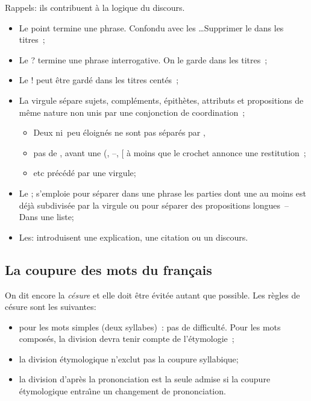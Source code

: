 \documentclass[twoside]{article}
\begin{document}
Rappels: ils contribuent \`a la logique du discours.
\begin{itemize}

\item Le point termine une phrase. Confondu avec les \ldots Supprimer le
dans les titres~;

\item Le ? termine une phrase interrogative. On le garde dans les
titres~;

\item Le ! peut \^etre gard\'e dans les titres cent\'es~;

\item La virgule s\'epare sujets, compl\'ements, \'epith\`etes,
attributs et propositions de m\^eme nature non unis par une conjonction
de coordination~;

\begin{itemize}

\item Deux \og ni\fg\ peu \'eloign\'es ne sont pas s\'epar\'es par ,

\item pas de , avant une (, --, [ \`a moins que le crochet annonce une
restitution~;

\item etc pr\'ec\'ed\'e par une virgule;

\end{itemize}

\item Le ; s'emploie pour s\'eparer dans une phrase les parties dont
une au moins est d\'ej\`a subdivis\'ee par la virgule ou pour s\'eparer
des propositions \og longues\fg\ -- Dans une liste;

\item Les: introduisent une explication, une citation ou un discours.

\end{itemize}

\subsection{La coupure des mots du fran\c cais} 

On dit encore la {\it c\'esure} et elle doit \^etre \'evit\'ee autant
que possible. Les règles de césure sont les suivantes:

\begin{itemize}

\item pour les mots simples (deux syllabes)~: pas de difficult\'e. Pour les
mots compos\'es, la division devra tenir compte de l'\'etymologie~;

\item la division \'etymologique n'exclut pas la coupure syllabique;

\item la division d'apr\`es la prononciation est la seule admise si la
coupure \'etymologique entra\^{\i}ne un changement de prononciation.

\end{itemize}
\end{document}
